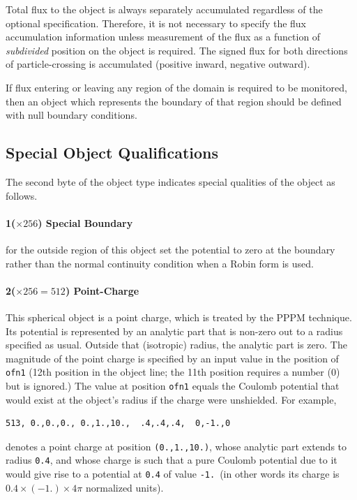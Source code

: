 \documentclass[12pt]{article}
\begin{document}
Total flux to the object is always separately accumulated regardless
of the optional specification.  Therefore, it is not necessary to
specify the flux accumulation information unless measurement of the
flux as a function of \emph{subdivided} position on the object is
required. The signed flux for both directions of particle-crossing
is accumulated (positive inward, negative outward). 

If flux entering or leaving any region of the domain is required to be
monitored, then an object which represents the boundary of that region
should be defined with null boundary conditions. 

\subsection{Special Object Qualifications}

The second byte of the object type indicates special qualities of the
object as follows. 

\paragraph{1($\times256$) Special Boundary} for the outside region of this
object set the potential to zero at the boundary rather than the
normal continuity condition when a Robin form is used.

\paragraph{2($\times256=512$) Point-Charge} This spherical object is a
point charge, which is treated by the PPPM technique. Its potential is
represented by an analytic part that is non-zero out to a radius
specified as usual. Outside that (isotropic) radius, the analytic part
is zero. The magnitude of the point charge is specified by an input
value in the position of \verb!ofn1! (12th position in the object
line; the 11th position requires a number (0) but is ignored.) The
value at position \verb!ofn1! equals the Coulomb potential that would
exist at the object's radius if the charge were unshielded.
For example,
\begin{verbatim}
513, 0.,0.,0., 0.,1.,10.,  .4,.4,.4,  0,-1.,0
\end{verbatim}
denotes a point charge at position \verb!(0.,1.,10.)!, whose
analytic part extends to radius \verb!0.4!, and whose charge is such
that a pure Coulomb potential due to it would give rise to a potential
at \verb!0.4! of value \verb!-1.!\ (in other words its charge is
$0.4\times(-1.)\times4\pi$ normalized units). 
\end{document}
